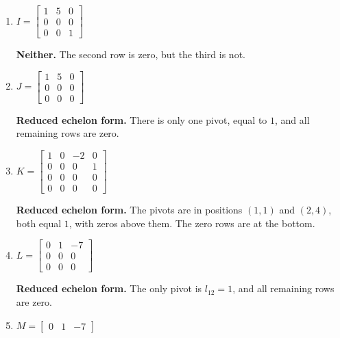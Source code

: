 \begin{enumerate}[label=\alph*)]
    \item $I=
    \begin{bmatrix}
        1&5&0\\
        0&0&0\\
        0&0&1
    \end{bmatrix}$

    \begin{answer}
        \textbf{Neither.}
        The second row is zero, but the third is not.
    \end{answer}

    \item $J=
    \begin{bmatrix}
        1&5&0\\
        0&0&0\\
        0&0&0
    \end{bmatrix}$

    \begin{answer}
        \textbf{Reduced echelon form.}
        There is only one pivot, equal to $1$,
        and all remaining rows are zero.
    \end{answer}

    \item $K=
    \begin{bmatrix}
        1&0&-2&0\\
        0&0&0&1\\
        0&0&0&0\\
        0&0&0&0
    \end{bmatrix}$

    \begin{answer}
        \textbf{Reduced echelon form.}
        The pivots are in positions $(1,1)$ and $(2,4)$,
        both equal $1$, with zeros above them.
        The zero rows are at the bottom.
    \end{answer}

    \item $L=
    \begin{bmatrix}
        0&1&-7\\
        0&0&0\\
        0&0&0
    \end{bmatrix}$

    \begin{answer}
        \textbf{Reduced echelon form.}
        The only pivot is $l_{12}=1$,
        and all remaining rows are zero.
    \end{answer}

    \item $M=
    \begin{bmatrix}
        0&1&-7
    \end{bmatrix}$


\end{enumerate}
